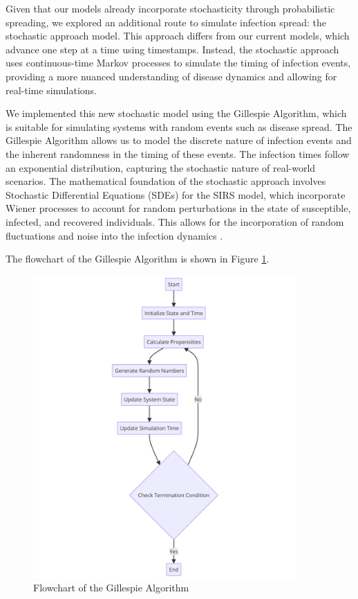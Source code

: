 Given that our models already incorporate stochasticity through probabilistic spreading, we explored an additional route to simulate infection spread: the stochastic approach model. This approach differs from our current models, which advance one step at a time using timestamps. Instead, the stochastic approach uses continuous-time Markov processes to simulate the timing of infection events, providing a more nuanced understanding of disease dynamics and allowing for real-time simulations.

We implemented this new stochastic model using the Gillespie Algorithm, which is suitable for simulating systems with random events such as disease spread. The Gillespie Algorithm allows us to model the discrete nature of infection events and the inherent randomness in the timing of these events. The infection times follow an exponential distribution, capturing the stochastic nature of real-world scenarios. The mathematical foundation of the stochastic approach involves Stochastic Differential Equations (SDEs) for the SIRS model, which incorporate Wiener processes to account for random perturbations in the state of susceptible, infected, and recovered individuals. This allows for the incorporation of random fluctuations and noise into the infection dynamics \cite{liu2020, paladini2011, rodriguez2020}.

The flowchart of the Gillespie Algorithm is shown in Figure \ref{fig:gillespie_algorithm}.

\begin{figure}[H]
    \centering
    \includegraphics[width=0.9\textwidth]{img/flowchart_algorithm.png}
    \caption{Flowchart of the Gillespie Algorithm}
    \label{fig:gillespie_algorithm}
\end{figure}

